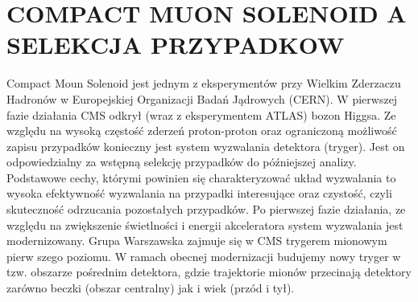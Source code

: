 \section{COMPACT MUON SOLENOID A SELEKCJA PRZYPADKOW}
\label{sec:1_CMS}

Compact Moun Solenoid jest jednym z eksperymentów przy Wielkim Zderzaczu Hadronów w Europejskiej Organizacji Badań Jądrowych (CERN). W pierwszej fazie działania CMS odkrył (wraz z eksperymentem ATLAS) bozon Higgsa. Ze względu na wysoką częstość zderzeń proton-proton oraz ograniczoną możliwość zapisu przypadków konieczny jest system wyzwalania detektora (tryger). Jest on odpowiedzialny za wstępną selekcję przypadków do późniejszej analizy. Podstawowe cechy, którymi powinien się charakteryzować układ wyzwalania to wysoka efektywność wyzwalania na przypadki interesujące oraz czystość, czyli skuteczność odrzucania pozostałych przypadków. Po pierwszej fazie działania, ze względu na zwiększenie świetlności i energii akceleratora system wyzwalania jest modernizowany. Grupa Warszawska zajmuje się w CMS trygerem mionowym pier­w
szego poziomu. W ramach obecnej modernizacji budujemy nowy tryger w tzw. obszarze pośrednim detektora, gdzie trajektorie mi­onów przecinają detektory za­równo beczki 
(obszar centralny) jak i wiek (przód i tył).
